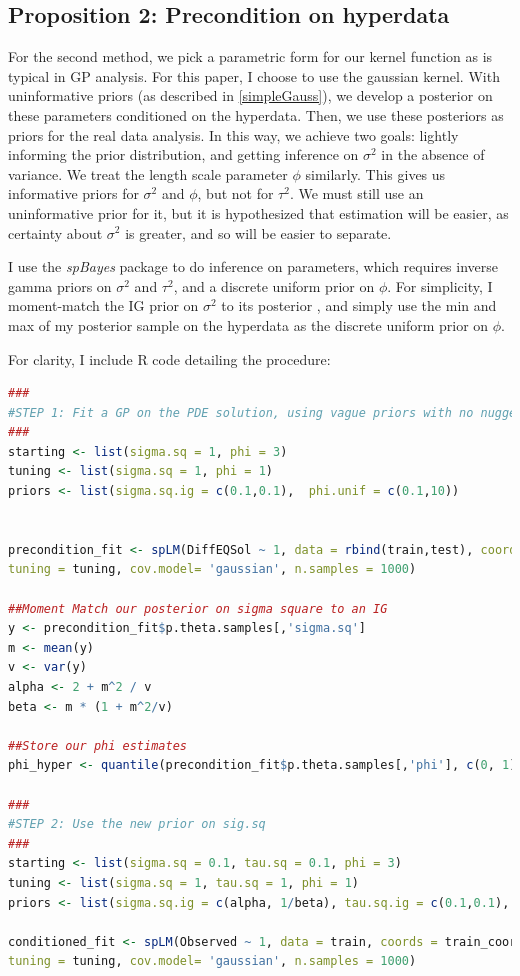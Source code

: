 \documentclass{article}
\begin{document}
	\subsection{Proposition 2: Precondition on hyperdata}
	
	For the second method, we pick a parametric form for our kernel function as is typical in GP analysis. For this paper, I choose to use the gaussian kernel. With uninformative priors (as described in \ref{simpleGauss}), we develop a posterior on these parameters conditioned on the hyperdata. Then, we use these posteriors as priors for the real data analysis. In this way, we achieve two goals: lightly informing the prior distribution, and getting inference on $\sigma^2$ in the absence of variance. We treat the length scale parameter $\phi$ similarly. This gives us informative priors for $\sigma^2$ and $\phi$, but not for $\tau^2$. We must still use an uninformative prior for it, but it is hypothesized that estimation will be easier, as certainty about $\sigma^2$ is greater, and so will be easier to separate.
	
	I use the \textit{spBayes} package \cite{spbayes1} \cite{spbayes2} to do inference on parameters, which requires inverse gamma priors on $\sigma^2$ and $\tau^2$, and a discrete uniform prior on $\phi$. For simplicity, I moment-match the IG prior on $\sigma^2$ to its posterior \cite{llera2016estimating}, and simply use the min and max of my posterior sample on the hyperdata as the discrete uniform prior on $\phi$.
	
	
	For clarity, I include R code detailing the procedure:
	
	\begin{lstlisting}[language=R]
###
#STEP 1: Fit a GP on the PDE solution, using vague priors with no nugget effect
###
starting <- list(sigma.sq = 1, phi = 3)
tuning <- list(sigma.sq = 1, phi = 1)
priors <- list(sigma.sq.ig = c(0.1,0.1),  phi.unif = c(0.1,10)) 


precondition_fit <- spLM(DiffEQSol ~ 1, data = rbind(train,test), coords = rbind(train_coords,test_coords), starting = starting, priors = priors,
tuning = tuning, cov.model= 'gaussian', n.samples = 1000)

##Moment Match our posterior on sigma square to an IG
y <- precondition_fit$p.theta.samples[,'sigma.sq']
m <- mean(y)
v <- var(y)
alpha <- 2 + m^2 / v
beta <- m * (1 + m^2/v)

##Store our phi estimates
phi_hyper <- quantile(precondition_fit$p.theta.samples[,'phi'], c(0, 1))

###
#STEP 2: Use the new prior on sig.sq
###
starting <- list(sigma.sq = 0.1, tau.sq = 0.1, phi = 3)
tuning <- list(sigma.sq = 1, tau.sq = 1, phi = 1)
priors <- list(sigma.sq.ig = c(alpha, 1/beta), tau.sq.ig = c(0.1,0.1), phi.unif = phi_hyper)

conditioned_fit <- spLM(Observed ~ 1, data = train, coords = train_coords, starting = starting, priors = priors,
tuning = tuning, cov.model= 'gaussian', n.samples = 1000)
	\end{lstlisting}
	
\end{document}
